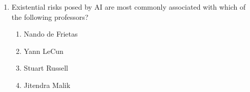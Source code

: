 \documentclass[12pt]{article}
\begin{document}
\begin{enumerate}[label=\arabic*.]
\begin{enumerate}[label=(\alph*)]
    \item The assumed variance of the Gaussian noise
    \item The use of a constant-term unit input
\end{enumerate}
\item Existential risks posed by AI are most commonly associated with which of the following professors?
\begin{enumerate}[label=(\alph*)]
    \item Nando de Frietas
    \item Yann LeCun
    \item Stuart Russell
    \item Jitendra Malik
\end{enumerate}
\end{enumerate}
\end{document}
